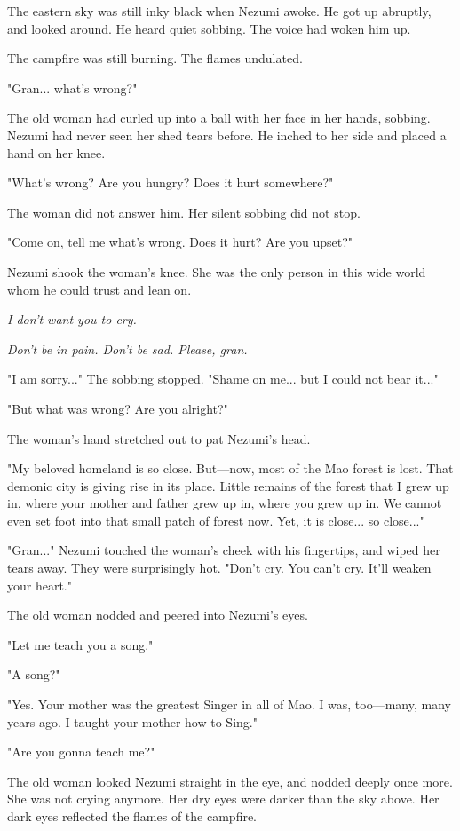 \mybreak

The eastern sky was still inky black when Nezumi awoke. He got up
abruptly, and looked around. He heard quiet sobbing. The voice had woken
him up.

The campfire was still burning. The flames undulated.

"Gran... what's wrong?"

The old woman had curled up into a ball with her face in her hands,
sobbing. Nezumi had never seen her shed tears before. He inched to her
side and placed a hand on her knee.

"What's wrong? Are you hungry? Does it hurt somewhere?"

The woman did not answer him. Her silent sobbing did not stop.

"Come on, tell me what's wrong. Does it hurt? Are you upset?"~

Nezumi shook the woman's knee. She was the only person in this wide
world whom he could trust and lean on.

\emph{I don't want you to cry.}

\emph{Don't be in pain. Don't be sad. Please, gran.}

"I am sorry..." The sobbing stopped. "Shame on me... but I could not
bear it..."

"But what was wrong? Are you alright?"

The woman's hand stretched out to pat Nezumi's head.

"My beloved homeland is so close. But---now, most of the Mao forest is
lost. That demonic city is giving rise in its place. Little remains of
the forest that I grew up in, where your mother and father grew up in,
where you grew up in. We cannot even set foot into that small patch of
forest now. Yet, it is close... so close..."

"Gran..." Nezumi touched the woman's cheek with his fingertips, and
wiped her tears away. They were surprisingly hot. "Don't cry. You can't
cry. It'll weaken your heart."

The old woman nodded and peered into Nezumi's eyes.

"Let me teach you a song."

"A song?"

"Yes. Your mother was the greatest Singer in all of Mao. I was,
too---many, many years ago. I taught your mother how to Sing."

"Are you gonna teach me?"

The old woman looked Nezumi straight in the eye, and nodded deeply once
more. She was not crying anymore. Her dry eyes were darker than the sky
above. Her dark eyes reflected the flames of the campfire.

